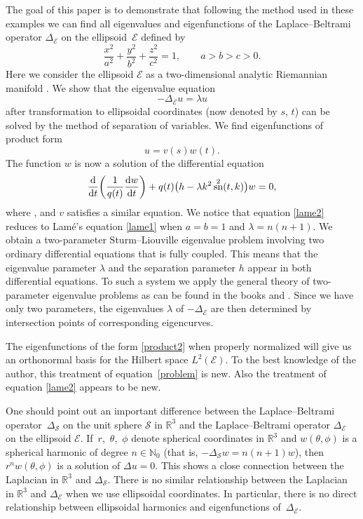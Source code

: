 \documentclass[pdftex]{sigma}
\newcommand{\R}{\mathbb{R}}
\newcommand{\N}{\mathbb{N}}
\newcommand{\E}{\mathcal{E}}
\newcommand{\Sp}{\mathcal{S}}
\newcommand{\D}{\Delta_\E}
\DeclareMathOperator{\sn}{sn}
\DeclareMathOperator{\cn}{cn}
\numberwithin{equation}{section}
\begin{document}
The goal of this paper is to demonstrate that following the method used in these examples we can find all eigenvalues and eigenfunctions of
the Laplace--Beltrami operator $\D$ on the ellipsoid~$\E$ defined by
\begin{equation}\label{ellipsoid}
 \frac{x^2}{a^2}+\frac{y^2}{b^2}+\frac{z^2}{c^2}=1,\qquad a>b>c>0.
 \end{equation}
Here we consider the ellipsoid $\E$ as a two-dimensional analytic Riemannian manifold \cite{J}.
We show that the eigenvalue equation
\begin{equation}\label{problem}
 -\D u=\lambda u
 \end{equation}
after transformation to ellipsoidal coordinates (now denoted by $s$, $t$) can be solved by the method of separation of variables.
We find eigenfunctions of product form
\begin{equation}\label{product2}
 u= v(s) w(t).
\end{equation}
The function $w$ is now a solution of the differential equation
\begin{equation}\label{lame2}
\frac{{\rm d}}{{\rm d}t}\biggl(\frac{1}{q(t)}\frac{{\rm d}w}{{\rm d}t}\biggr)+q(t)\bigl(h-\lambda k^2\sn^2(t,k)\bigr)w=0,
\end{equation}
where \smash{$q(t):=\bigl(a^2\cn^2(t,k)+b^2\sn^2(t,k)\bigr)^{1/2}$},
and $v$ satisfies a similar equation.
We notice that equation \eqref{lame2} reduces to Lam\'e's equation \eqref{lame1}
when $a=b=1$ and $\lambda=n(n+1)$.
We obtain a two-parameter Sturm--Liouville eigenvalue problem
involving two ordinary differential equations
that is fully coupled. This means that the eigenvalue parameter $\lambda$ and the separation parameter $h$
appear in both differential equations. To such a system we
apply the general theory of two-parameter eigenvalue problems as can be found in the books
\cite{AM} and \cite{Vbook}. Since we have only two parameters, the eigenvalues $\lambda$ of $-\D$ are then determined by intersection points of corresponding eigencurves.

The eigenfunctions of the form \eqref{product2} when properly normalized will give us an orthonormal basis
for the Hilbert space $L^2(\E)$.
To the best knowledge of the author, this treatment of equation~\eqref{problem}
is new. Also the treatment of equation \eqref{lame2} appears to be new.

One should point out an important difference between the Laplace--Beltrami operator~$\Delta_\Sp$ on the unit sphere $\Sp$ in $\R^3$ and
the Laplace--Beltrami operator $\Delta_\E$ on the ellipsoid $\E$.
If~$r$,~$\theta$,~$\phi$ denote spherical coordinates in $\R^3$ and $w(\theta,\phi)$ is a spherical harmonic of degree $n\in\N_0$ (that is, $-\Delta_\Sp w=n(n+1)w$), then $r^nw(\theta,\phi)$ is a solution of $\Delta u=0$.
This shows a close connection between the Laplacian in $\R^3$ and $\Delta_\Sp$.
There is no similar relationship between the Laplacian in $\R^3$ and $\Delta_\E$ when we use ellipsoidal coordinates. In particular,
there is no direct relationship between ellipsoidal harmonics and eigenfunctions of~$\Delta_\E$.
\end{document}
